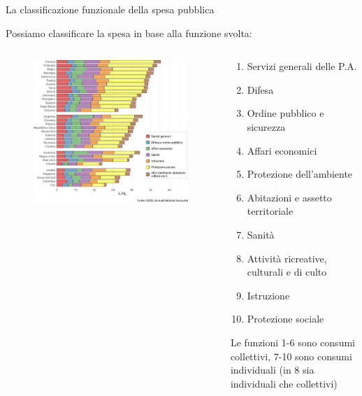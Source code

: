 \documentclass[aspectratio=64,12pt]{beamer}
\begin{document}
\begin{frame}{La classificazione funzionale della spesa pubblica}
\begin{resize}{.9}  
Possiamo classificare la spesa in base alla funzione svolta:

\begin{columns}
\begin{column}{.6\columnwidth}
\begin{figure}
\centering
\includegraphics[width=\textwidth]{./figure/spesa-pubblica-per-funzioni-2019-orizz-color.pdf}
\end{figure}
\end{column}

\begin{column}{.4\columnwidth}
\footnotesize
\begin{enumerate}
\item Servizi generali delle P.A.
\item Difesa
\item Ordine pubblico e sicurezza
\item Affari economici
\item Protezione dell’ambiente
\item Abitazioni e assetto territoriale
\item Sanità
\item Attività ricreative, culturali e di culto
\item Istruzione
\item Protezione sociale
\end{enumerate}
Le funzioni 1-6 sono consumi collettivi, 7-10 sono consumi individuali (in 8 sia individuali che collettivi)
\end{column}
\end{columns}
\end{resize}
\end{frame}
\end{document}
